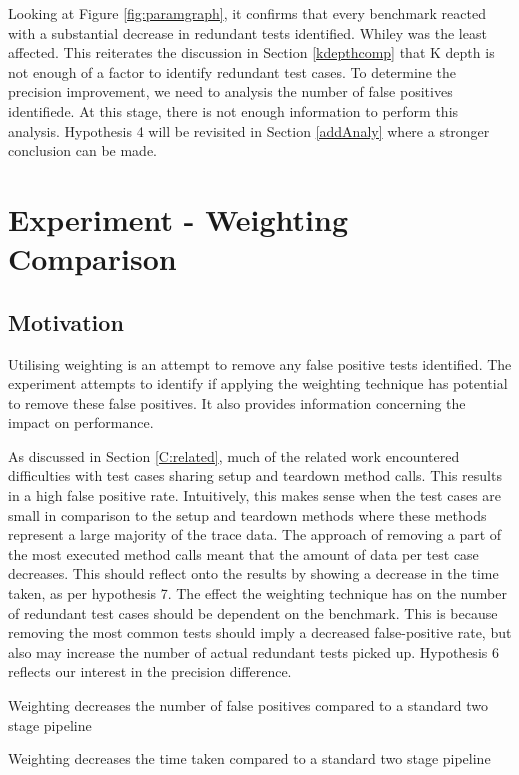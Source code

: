 Looking at Figure \ref{fig:paramgraph}, it confirms that every benchmark reacted with a substantial decrease in redundant tests identified. Whiley was the least affected. This reiterates the discussion in Section \ref{kdepthcomp} that K depth is not enough of a factor to identify redundant test cases. To determine the precision improvement, we need to analysis the number of false positives identifiede.  At this stage, there is not enough information to perform this analysis. Hypothesis 4 will be revisited in Section \ref{addAnaly} where a stronger conclusion can be made.

\section{Experiment  - Weighting Comparison}
\label{sec:weight}

\subsection{Motivation}
Utilising weighting is an attempt to remove any false positive tests identified. The experiment attempts to identify if applying the weighting technique has potential to remove these false positives. It also provides information concerning the impact on performance.

As discussed in Section \ref{C:related}, much of the related work encountered difficulties with test cases sharing setup and teardown method calls. This results in a high false positive rate. Intuitively, this makes sense when the test cases are small in comparison to the setup and teardown methods where these methods represent a large majority of the trace data. The approach of removing a part of the most executed method calls meant that the amount of data per test case decreases. This should reflect onto the results by showing a decrease in the time taken, as per hypothesis 7. The effect the weighting technique has on the number of redundant test cases should be dependent on the benchmark. This is because removing the most common tests should imply a decreased false-positive rate, but also may increase the number of actual redundant tests picked up. Hypothesis 6 reflects our interest in the precision difference.

\begin{hyp}
Weighting decreases the number of false positives compared to a standard two stage pipeline
\end{hyp}

\begin{hyp}
Weighting decreases the time taken compared to a standard two stage pipeline
\end{hyp}

